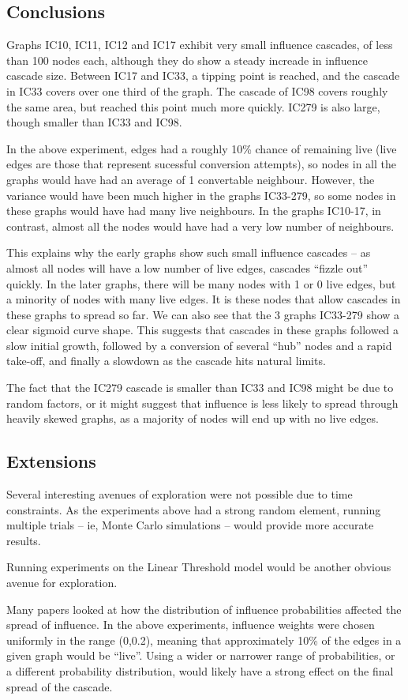 \subsection{Conclusions}

Graphs IC10, IC11, IC12 and IC17 exhibit very small influence cascades, of less than 100 nodes each, although they do show a steady increade in influence cascade size. Between IC17 and IC33, a tipping point is reached, and the cascade in IC33 covers over one third of the graph. The cascade of IC98 covers roughly the same area, but reached this point much more quickly. IC279 is also large, though smaller than IC33 and IC98.

In the above experiment, edges had a roughly 10\% chance of remaining live (live edges are those that represent sucessful conversion attempts), so nodes in all the graphs would have had an average of 1 convertable neighbour. However, the variance would have been much higher in the graphs IC33-279, so some nodes in these graphs would have had many live neighbours. In the graphs IC10-17, in contrast, almost all the nodes would have had a very low number of neighbours.

This explains why the early graphs show such small influence cascades -- as almost all nodes will have a low number of live edges, cascades ``fizzle out'' quickly. In the later graphs, there will be many nodes with 1 or 0 live edges, but a minority of nodes with many live edges. It is these nodes that allow cascades in these graphs to spread so far. We can also see that the 3 graphs IC33-279 show a clear sigmoid curve shape. This suggests that cascades in these graphs followed a slow initial growth, followed by a conversion of several ``hub'' nodes and a rapid take-off, and finally a slowdown as the cascade hits natural limits.

The fact that the IC279 cascade is smaller than IC33 and IC98 might be due to random factors, or it might suggest that influence is less likely to spread through heavily skewed graphs, as a majority of nodes will end up with no live edges.

\subsection{Extensions}

Several interesting avenues of exploration were not possible due to time constraints. 
As the experiments above had a strong random element, running multiple trials -- ie, Monte Carlo simulations -- would provide more accurate results.

Running experiments on the Linear Threshold model would be another obvious avenue for exploration.

Many papers looked at how the distribution of influence probabilities affected the spread of influence. In the above experiments, influence weights were chosen uniformly in the range (0,0.2), meaning that approximately 10\% of the edges in a given graph would be ``live''. Using a wider or narrower range of probabilities, or a different probability distribution, would likely have a strong effect on the final spread of the cascade.


